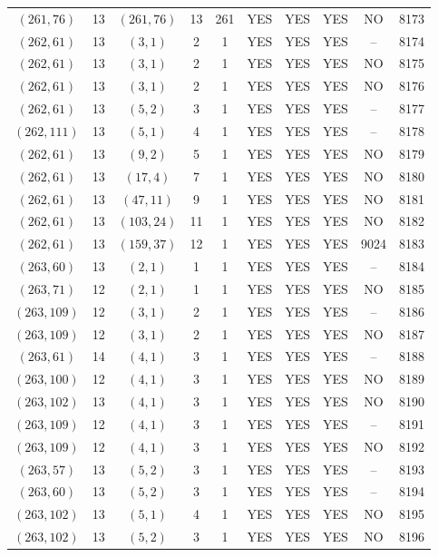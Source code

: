 \begin{longtable}{|c|c|c|c|c|c|c|c|c|c|}
$(261, 76)$ & 13 & $(261, 76)$ & 13 & 261 & YES & YES & YES & NO & 8173\\
$(262, 61)$ & 13 & $(3, 1)$ & 2 & 1 & YES & YES & YES & -- & 8174\\
$(262, 61)$ & 13 & $(3, 1)$ & 2 & 1 & YES & YES & YES & NO & 8175\\
$(262, 61)$ & 13 & $(3, 1)$ & 2 & 1 & YES & YES & YES & NO & 8176\\
$(262, 61)$ & 13 & $(5, 2)$ & 3 & 1 & YES & YES & YES & -- & 8177\\
$(262, 111)$ & 13 & $(5, 1)$ & 4 & 1 & YES & YES & YES & -- & 8178\\
$(262, 61)$ & 13 & $(9, 2)$ & 5 & 1 & YES & YES & YES & NO & 8179\\
$(262, 61)$ & 13 & $(17, 4)$ & 7 & 1 & YES & YES & YES & NO & 8180\\
$(262, 61)$ & 13 & $(47, 11)$ & 9 & 1 & YES & YES & YES & NO & 8181\\
$(262, 61)$ & 13 & $(103, 24)$ & 11 & 1 & YES & YES & YES & NO & 8182\\
$(262, 61)$ & 13 & $(159, 37)$ & 12 & 1 & YES & YES & YES & 9024 & 8183\\
$(263, 60)$ & 13 & $(2, 1)$ & 1 & 1 & YES & YES & YES & -- & 8184\\
$(263, 71)$ & 12 & $(2, 1)$ & 1 & 1 & YES & YES & YES & NO & 8185\\
$(263, 109)$ & 12 & $(3, 1)$ & 2 & 1 & YES & YES & YES & -- & 8186\\
$(263, 109)$ & 12 & $(3, 1)$ & 2 & 1 & YES & YES & YES & NO & 8187\\
$(263, 61)$ & 14 & $(4, 1)$ & 3 & 1 & YES & YES & YES & -- & 8188\\
$(263, 100)$ & 12 & $(4, 1)$ & 3 & 1 & YES & YES & YES & NO & 8189\\
$(263, 102)$ & 13 & $(4, 1)$ & 3 & 1 & YES & YES & YES & NO & 8190\\
$(263, 109)$ & 12 & $(4, 1)$ & 3 & 1 & YES & YES & YES & -- & 8191\\
$(263, 109)$ & 12 & $(4, 1)$ & 3 & 1 & YES & YES & YES & NO & 8192\\
$(263, 57)$ & 13 & $(5, 2)$ & 3 & 1 & YES & YES & YES & -- & 8193\\
$(263, 60)$ & 13 & $(5, 2)$ & 3 & 1 & YES & YES & YES & -- & 8194\\
$(263, 102)$ & 13 & $(5, 1)$ & 4 & 1 & YES & YES & YES & NO & 8195\\
$(263, 102)$ & 13 & $(5, 2)$ & 3 & 1 & YES & YES & YES & NO & 8196\\

\end{longtable}
